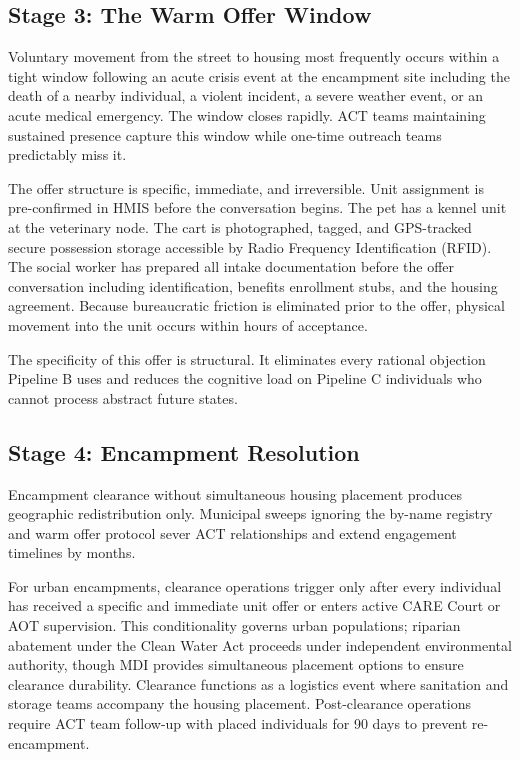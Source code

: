 \documentclass[12pt, letterpaper]{article}
\begin{document}
\subsection{Stage 3: The Warm Offer Window}

Voluntary movement from the street to housing most frequently occurs within a tight window following an acute crisis event at the encampment site including the death of a nearby individual, a violent incident, a severe weather event, or an acute medical emergency. The window closes rapidly. ACT teams maintaining sustained presence capture this window while one-time outreach teams predictably miss it.

The offer structure is specific, immediate, and irreversible. Unit assignment is pre-confirmed in HMIS before the conversation begins. The pet has a kennel unit at the veterinary node. The cart is photographed, tagged, and GPS-tracked secure possession storage accessible by Radio Frequency Identification (RFID). The social worker has prepared all intake documentation before the offer conversation including identification, benefits enrollment stubs, and the housing agreement. Because bureaucratic friction is eliminated prior to the offer, physical movement into the unit occurs within hours of acceptance.

The specificity of this offer is structural. It eliminates every rational objection Pipeline B uses and reduces the cognitive load on Pipeline C individuals who cannot process abstract future states.

\subsection{Stage 4: Encampment Resolution}

Encampment clearance without simultaneous housing placement produces geographic redistribution only. Municipal sweeps ignoring the by-name registry and warm offer protocol sever ACT relationships and extend engagement timelines by months.

For urban encampments, clearance operations trigger only after every individual has received a specific and immediate unit offer or enters active CARE Court or AOT supervision. This conditionality governs urban populations; riparian abatement under the Clean Water Act proceeds under independent environmental authority, though MDI provides simultaneous placement options to ensure clearance durability. Clearance functions as a logistics event where sanitation and storage teams accompany the housing placement. Post-clearance operations require ACT team follow-up with placed individuals for 90 days to prevent re-encampment.
\end{document}
